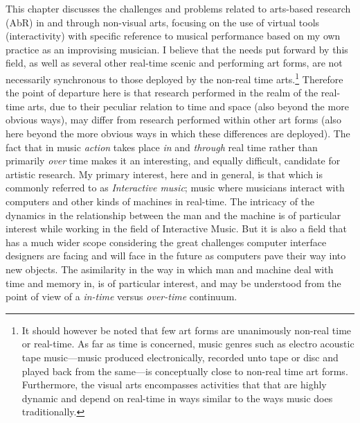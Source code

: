 \noindent
This chapter discusses the challenges and problems related to arts-based research (AbR) in and through non-visual arts, focusing on the use of virtual tools (interactivity) with specific reference to musical performance based on my own practice as an improvising musician. I believe that the needs put forward by this field, as well as several other real-time scenic and performing art forms, are not necessarily synchronous to those deployed by the non-real time arts.\footnote{It should however be noted that few art forms are unanimously non-real time or real-time. As far as time is concerned, music genres such as electro acoustic tape music---music produced electronically, recorded unto tape or disc and played back from the same---is conceptually close to non-real time art forms. Furthermore, the visual arts encompasses activities that that are highly dynamic and depend on real-time in ways similar to the ways music does traditionally.} Therefore the point of departure here is that research performed in the realm of the real-time arts, due to their peculiar relation to time and space (also beyond the more obvious ways), may differ from research performed within other art forms (also here beyond the more obvious ways in which these differences are deployed). The fact that in music \emph{action} takes place \emph{in} and \emph{through} real time rather than primarily \emph{over} time makes it an interesting, and equally difficult, candidate for artistic research. My primary interest, here and in general, is that which is commonly referred to as \emph{Interactive   music}; music where musicians interact with computers and other kinds of machines in real-time. 
The intricacy of the dynamics in the relationship between the man and the machine is of particular interest while working in the field of Interactive Music. But it is also a field that has a much wider scope considering the great challenges computer interface designers are facing and will face in the future as computers pave their way into new objects. The asimilarity in the way in which man and machine deal with time and memory in, is of particular interest, and may be understood from the point of view of a \emph{in-time} versus \emph{over-time} continuum.

